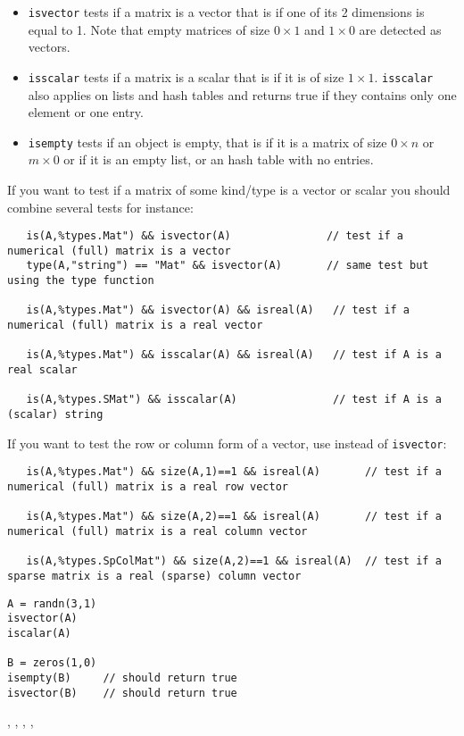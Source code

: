 \begin{mandescription}
\begin{itemize}
\item \verb+isvector+ tests if a matrix is a vector that is if one of its 2 dimensions is equal to 1. 
      Note that empty matrices of size $0 \times 1$ and $1 \times 0$ are detected as vectors.
\item \verb+isscalar+ tests if a matrix is a scalar that is if it is of size $1 \times 1$.
      \verb+isscalar+ also applies on lists and hash tables and returns true if they contains only
      one element or one entry.
\item \verb+isempty+ tests if an object is empty, that is if it is a matrix of size $0 \times n$ or $m \times 0$ or
      if it is an empty list, or an hash table with no entries.
\end{itemize}

If you want to test if a matrix of some kind/type is a vector or scalar you should combine
several tests for instance:
\begin{verbatim}
   is(A,%types.Mat") && isvector(A)               // test if a numerical (full) matrix is a vector
   type(A,"string") == "Mat" && isvector(A)       // same test but using the type function

   is(A,%types.Mat") && isvector(A) && isreal(A)   // test if a numerical (full) matrix is a real vector

   is(A,%types.Mat") && isscalar(A) && isreal(A)   // test if A is a real scalar

   is(A,%types.SMat") && isscalar(A)               // test if A is a (scalar) string
\end{verbatim}

If you want to test the row or column form of a vector, use  instead of \verb+isvector+:
\begin{verbatim}
   is(A,%types.Mat") && size(A,1)==1 && isreal(A)       // test if a numerical (full) matrix is a real row vector

   is(A,%types.Mat") && size(A,2)==1 && isreal(A)       // test if a numerical (full) matrix is a real column vector

   is(A,%types.SpColMat") && size(A,2)==1 && isreal(A)  // test if a sparse matrix is a real (sparse) column vector
\end{verbatim}

\end{mandescription}

\begin{examples}
\begin{Verbatim}
A = randn(3,1)
isvector(A)
iscalar(A)

B = zeros(1,0)
isempty(B)     // should return true
isvector(B)    // should return true
\end{Verbatim}
\end{examples}

\begin{manseealso}
   , , , ,  
\end{manseealso}

